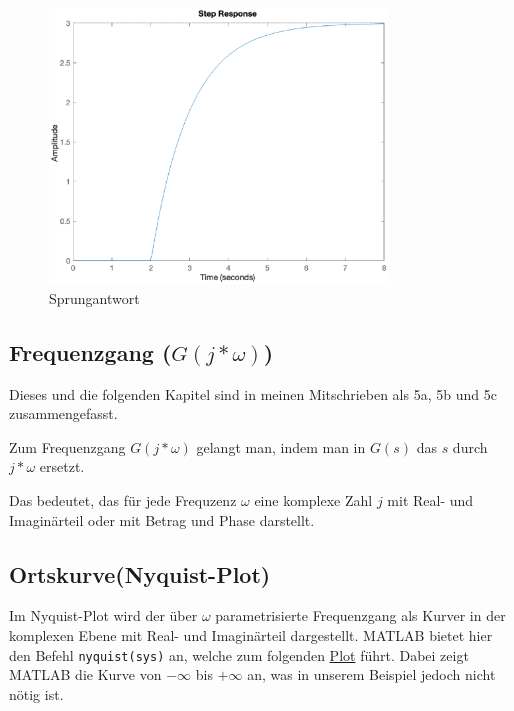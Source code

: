 \begin{figure}[H]
    \label{fig:sprung}
    \centering
    \includegraphics[width=0.8\textwidth]{Bilder/SprungantwortPT1Tt.eps}
    \caption{Sprungantwort}
 \end{figure}


\subsection{Frequenzgang ($G(j * \omega)$)}
Dieses und die folgenden Kapitel sind in meinen Mitschrieben als 5a, 5b und 5c zusammengefasst.

Zum Frequenzgang $G(j * \omega)$ gelangt man, indem man in $G(s)$ das $s$ durch $j * \omega$ ersetzt.

Das bedeutet, das für jede Frequzenz $\omega$ eine komplexe Zahl $j$ mit Real- und Imaginärteil oder mit Betrag und Phase darstellt.

\subsection{Ortskurve(Nyquist-Plot)}
Im Nyquist-Plot wird der über $\omega$ parametrisierte Frequenzgang als Kurver in der komplexen Ebene mit Real- und Imaginärteil dargestellt.
MATLAB bietet hier den Befehl \texttt{nyquist(sys)} an, welche zum folgenden \hyperref[fig:nyquist]{Plot} führt. Dabei zeigt MATLAB die Kurve von $-\infty$ bis $+\infty$ an, was in unserem Beispiel jedoch nicht nötig ist.


